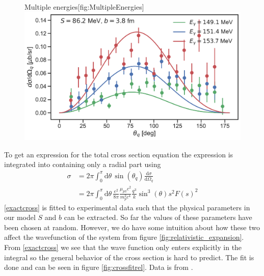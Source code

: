 \begin{figure}[H]
    \begin{sidecaption}{Multiple energies}[fig:MultipleEnergies]
    \includegraphics[width=\linewidth]{Figures/MultiDiffcross_rel.pdf}
    \end{sidecaption}
\end{figure}
To get an expression for the total cross section equation the expression is integrated into containing only a radial part using
\begin{align} \label{exactcross}
    \sigma & = 2\pi \int_0^\pi \text{d}\theta \, \sin(\theta_q) \frac{\text{d}\sigma}{\text{d}\Omega_q} \\ &= 2\pi \int_0^\pi \text{d}\theta \, \frac{e^2}{8\pi}\frac{\mu_{p\pi}c^2}{m_p^2c^4}\frac{q^3}{k}\sin^3(\theta) s^2 F(s)^2
\end{align}
\eqref{exactcross} is fitted to experimental data such that the physical parameters in our model $S$ and $b$ can be extracted. So far the values of these parameters have been chosen at random. However, we do have some intuition about how these two affect the wavefunction of the system from figure \ref{fig:relativistic_expansion}. From \eqref{exactcross} we see that the wave function only enters explicitly in the integral so the general behavior of the cross section is hard to predict. The fit is done and can be seen in figure \ref{fig:crossfitrel}. Data is from \cite[]{Schmidt_2001}.
